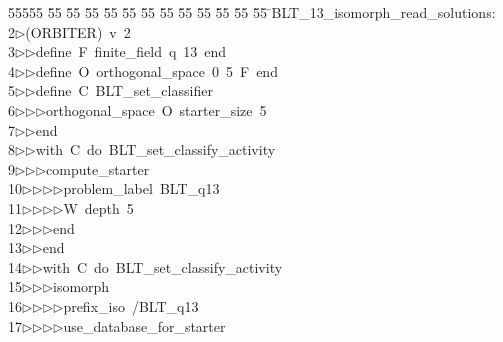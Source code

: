 %
%
\begin{tabbing}
55555 \= 55 \= 55 \= 55 \= 55 \= 55 \= 55 \= 55 \= 55 \= 55 \= 55 \= 55 \= 55 \= \>BLT\_13\_isomorph\_read\_solutions:\\[0pt]
2\>$\triangleright$\>(ORBITER)\ v\ 2\ \\[0pt]
3\>$\triangleright$\>$\triangleright$\>define\ F\ finite\_field\ q\ 13\ end\ \\[0pt]
4\>$\triangleright$\>$\triangleright$\>define\ O\ orthogonal\_space\ 0\ 5\ F\ end\ \\[0pt]
5\>$\triangleright$\>$\triangleright$\>define\ C\ BLT\_set\_classifier\ \\[0pt]
6\>$\triangleright$\>$\triangleright$\>$\triangleright$\>orthogonal\_space\ O\ starter\_size\ 5\ \\[0pt]
7\>$\triangleright$\>$\triangleright$\>end\ \\[0pt]
8\>$\triangleright$\>$\triangleright$\>with\ C\ do\ BLT\_set\_classify\_activity\ \\[0pt]
9\>$\triangleright$\>$\triangleright$\>$\triangleright$\>compute\_starter\ \\[0pt]
10\>$\triangleright$\>$\triangleright$\>$\triangleright$\>$\triangleright$\>problem\_label\ BLT\_q13\ \\[0pt]
11\>$\triangleright$\>$\triangleright$\>$\triangleright$\>$\triangleright$\>W\ depth\ 5\ \\[0pt]
12\>$\triangleright$\>$\triangleright$\>$\triangleright$\>end\ \\[0pt]
13\>$\triangleright$\>$\triangleright$\>end\ \\[0pt]
14\>$\triangleright$\>$\triangleright$\>with\ C\ do\ BLT\_set\_classify\_activity\ \\[0pt]
15\>$\triangleright$\>$\triangleright$\>$\triangleright$\>isomorph\ \\[0pt]
16\>$\triangleright$\>$\triangleright$\>$\triangleright$\>$\triangleright$\>prefix\_iso\ /BLT\_q13\ \\[0pt]
17\>$\triangleright$\>$\triangleright$\>$\triangleright$\>$\triangleright$\>use\_database\_for\_starter\ \\[0pt]

\end{tabbing}
